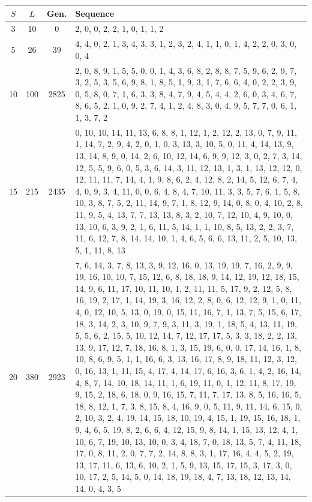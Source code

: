 \documentclass[paper=a4, fontsize=10pt]{scrartcl} %
\begin{document}
\begin{table}
{\tiny
\begin{tabularx}{\textwidth}{cccX}
\toprule
$S$ & $L$ & Gen. & Sequence \\
\midrule
3   & 10  & 0   & 2, 0, 0, 2, 2, 1, 0, 1, 1, 2 \\
5   & 26  & 39  & 4, 4, 0, 2, 1, 3, 4, 3, 3, 1, 2, 3, 2, 4, 1, 1, 0, 1, 4, 2, 2, 0, 3, 0, 0, 4 \\
10  & 100 & 2825 & 2, 0, 8, 9, 1, 5, 5, 0, 0, 1, 4, 3, 6, 8, 2, 8, 8, 7, 5, 9, 6, 2, 9, 7, 3, 2, 5, 3, 5, 6, 9, 8, 1, 8, 5, 1, 9, 3, 1, 7, 6, 6, 4, 0, 2, 2, 3, 9, 0, 5, 8, 0, 7, 1, 6, 3, 3, 8, 4, 7, 9, 4, 5, 4, 4, 2, 6, 0, 3, 4, 6, 7, 8, 6, 5, 2, 1, 0, 9, 2, 7, 4, 1, 2, 4, 8, 3, 0, 4, 9, 5, 7, 7, 0, 6, 1, 1, 3, 7, 2 \\
15  & 215 & 2435 & 0, 10, 10, 14, 11, 13, 6, 8, 8, 1, 12, 1, 2, 12, 2, 13, 0, 7, 9, 11, 1, 14, 7, 2, 9, 4, 2, 0, 1, 0, 3, 13, 3, 10, 5, 0, 11, 4, 14, 13, 9, 13, 14, 8, 9, 0, 14, 2, 6, 10, 12, 14, 6, 9, 9, 12, 3, 0, 2, 7, 3, 14, 12, 5, 5, 9, 6, 0, 5, 3, 6, 14, 3, 11, 12, 13, 1, 3, 1, 13, 12, 12, 0, 12, 11, 11, 7, 14, 4, 1, 9, 8, 6, 2, 4, 12, 8, 2, 14, 5, 12, 6, 7, 4, 4, 0, 9, 3, 4, 11, 0, 0, 6, 4, 8, 4, 7, 10, 11, 3, 3, 5, 7, 6, 1, 5, 8, 10, 3, 8, 7, 5, 2, 11, 14, 9, 7, 1, 8, 12, 9, 14, 0, 8, 0, 4, 10, 2, 8, 11, 9, 5, 4, 13, 7, 7, 13, 13, 8, 3, 2, 10, 7, 12, 10, 4, 9, 10, 0, 13, 10, 6, 3, 9, 2, 1, 6, 11, 5, 14, 1, 1, 10, 8, 5, 13, 2, 2, 3, 7, 11, 6, 12, 7, 8, 14, 14, 10, 1, 4, 6, 5, 6, 6, 13, 11, 2, 5, 10, 13, 5, 1, 11, 8, 13 \\
20  & 380 & 2923 & 7, 6, 14, 3, 7, 8, 13, 3, 9, 12, 16, 0, 13, 19, 19, 7, 16, 2, 9, 9, 19, 16, 10, 10, 7, 15, 12, 6, 8, 18, 18, 9, 14, 12, 19, 12, 18, 15, 14, 9, 6, 11, 17, 10, 11, 10, 1, 2, 11, 11, 5, 17, 9, 2, 12, 5, 8, 16, 19, 2, 17, 1, 14, 19, 3, 16, 12, 2, 8, 0, 6, 12, 12, 9, 1, 0, 11, 4, 0, 12, 10, 5, 13, 0, 19, 0, 15, 11, 16, 7, 1, 13, 7, 5, 15, 6, 17, 18, 3, 14, 2, 3, 10, 9, 7, 9, 3, 11, 3, 19, 1, 18, 5, 4, 13, 11, 19, 5, 5, 6, 2, 15, 5, 10, 12, 14, 7, 12, 17, 17, 5, 3, 3, 18, 2, 2, 13, 13, 9, 17, 12, 7, 18, 16, 8, 1, 3, 15, 19, 6, 0, 0, 17, 14, 16, 1, 8, 10, 8, 6, 9, 5, 1, 1, 16, 6, 3, 13, 16, 17, 8, 9, 18, 11, 12, 3, 12, 0, 16, 13, 1, 11, 15, 4, 17, 4, 14, 17, 6, 16, 3, 6, 1, 4, 2, 16, 14, 4, 8, 7, 14, 10, 18, 14, 11, 1, 6, 19, 11, 0, 1, 12, 11, 8, 17, 19, 9, 15, 2, 18, 6, 18, 0, 9, 16, 15, 7, 11, 7, 17, 13, 8, 5, 16, 16, 5, 18, 8, 12, 1, 7, 3, 8, 15, 8, 4, 16, 9, 0, 5, 11, 9, 11, 14, 6, 15, 0, 2, 10, 3, 2, 4, 19, 14, 15, 18, 10, 19, 4, 15, 1, 19, 15, 16, 18, 1, 9, 4, 6, 5, 19, 8, 2, 6, 6, 4, 12, 15, 9, 8, 14, 1, 15, 13, 12, 4, 1, 10, 6, 7, 19, 10, 13, 10, 0, 3, 4, 18, 7, 0, 18, 13, 5, 7, 4, 11, 18, 17, 0, 8, 11, 2, 0, 7, 7, 2, 14, 8, 8, 3, 1, 17, 16, 4, 4, 5, 2, 19, 13, 17, 11, 6, 13, 6, 10, 2, 1, 5, 9, 13, 15, 17, 15, 3, 17, 3, 0, 10, 17, 2, 5, 14, 5, 0, 14, 18, 19, 18, 4, 7, 13, 18, 12, 13, 14, 14, 0, 4, 3, 5 \\

\end{tabularx}}
\end{table}
\end{document}
